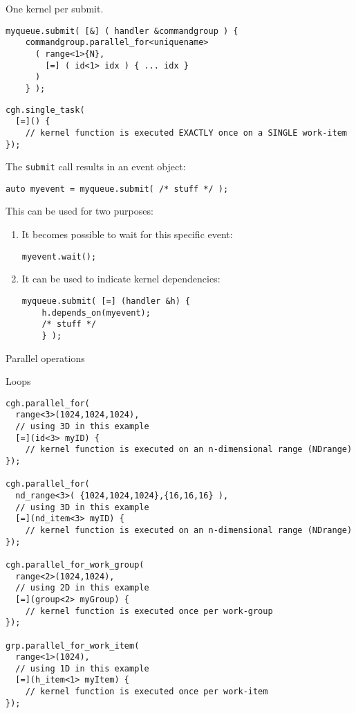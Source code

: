 One kernel per submit.

\begin{lstlisting}
myqueue.submit( [&] ( handler &commandgroup ) {
    commandgroup.parallel_for<uniquename> 
      ( range<1>{N},
        [=] ( id<1> idx ) { ... idx }
      )
    } );
\end{lstlisting}

\begin{lstlisting}
cgh.single_task(
  [=]() {
    // kernel function is executed EXACTLY once on a SINGLE work-item
});
\end{lstlisting}

The \lstinline+submit+ call results in an event object:
\begin{lstlisting}
auto myevent = myqueue.submit( /* stuff */ );
\end{lstlisting}
This can be used for two purposes:
\begin{enumerate}
\item It becomes possible to wait for this specific event:
\begin{lstlisting}
myevent.wait();    
\end{lstlisting}
\item It can be used to indicate kernel dependencies:
\begin{lstlisting}
myqueue.submit( [=] (handler &h) {
    h.depends_on(myevent);
    /* stuff */
    } );
\end{lstlisting}
\end{enumerate}

 {Parallel operations}

 {Loops}
  
\begin{lstlisting}
cgh.parallel_for(
  range<3>(1024,1024,1024),
  // using 3D in this example
  [=](id<3> myID) {
    // kernel function is executed on an n-dimensional range (NDrange)
});

cgh.parallel_for(
  nd_range<3>( {1024,1024,1024},{16,16,16} ),
  // using 3D in this example 
  [=](nd_item<3> myID) {
    // kernel function is executed on an n-dimensional range (NDrange)
});

cgh.parallel_for_work_group(
  range<2>(1024,1024),
  // using 2D in this example
  [=](group<2> myGroup) {
    // kernel function is executed once per work-group
});

grp.parallel_for_work_item(
  range<1>(1024),
  // using 1D in this example
  [=](h_item<1> myItem) {
    // kernel function is executed once per work-item
});
\end{lstlisting}

